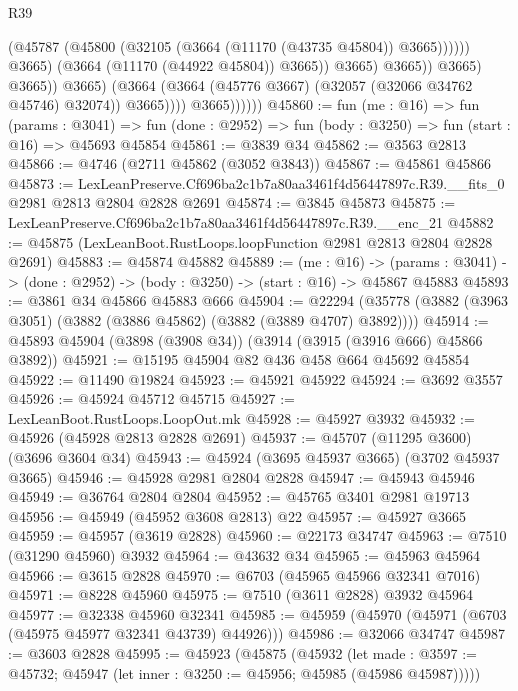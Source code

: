 \begin{lexlean}{R39}
\begin{coremodule}
                                            (@45787
                                              (@45800
                                                (@32105 (@3664 (@11170 (@43735 @45804)) @3665))))))
                                        @3665)
                                      (@3664 (@11170 (@44922 @45804)) @3665))
                                    @3665)
                                  @3665))
                              @3665)
                            @3665))
                        @3665)
                      (@3664 (@3664 (@45776 @3667) (@32057 (@32066 @34762 @45746) @32074)) @3665))))
                @3665))))))
@45860 := fun (me : @16) =>
  fun (params : @3041) =>
  fun (done : @2952) => fun (body : @3250) => fun (start : @16) => @45693 @45854
@45861 := @3839 @34
@45862 := @3563 @2813
@45866 := @4746 (@2711 @45862 (@3052 @3843))
@45867 := @45861 @45866
@45873 := LexLeanPreserve.Cf696ba2c1b7a80aa3461f4d56447897c.R39.__fits_0
    @2981
    @2813
    @2804
    @2828
    @2691
@45874 := @3845 @45873
@45875 := LexLeanPreserve.Cf696ba2c1b7a80aa3461f4d56447897c.R39.__enc_21
@45882 := @45875 (LexLeanBoot.RustLoops.loopFunction @2981 @2813 @2804 @2828 @2691)
@45883 := @45874 @45882
@45889 := (me : @16) ->
  (params : @3041) -> (done : @2952) -> (body : @3250) -> (start : @16) -> @45867 @45883
@45893 := @3861 @34 @45866 @45883 @666
@45904 := @22294 (@35778 (@3882 (@3963 @3051) (@3882 (@3886 @45862) (@3882 (@3889 @4707) @3892))))
@45914 := @45893 @45904 (@3898 (@3908 @34)) (@3914 (@3915 (@3916 @666) @45866 @3892))
@45921 := @15195 @45904 @82 @436 @458 @664 @45692 @45854
@45922 := @11490 @19824
@45923 := @45921 @45922
@45924 := @3692 @3557
@45926 := @45924 @45712 @45715
@45927 := LexLeanBoot.RustLoops.LoopOut.mk
@45928 := @45927 @3932
@45932 := @45926 (@45928 @2813 @2828 @2691)
@45937 := @45707 (@11295 @3600) (@3696 @3604 @34)
@45943 := @45924 (@3695 @45937 @3665) (@3702 @45937 @3665)
@45946 := @45928 @2981 @2804 @2828
@45947 := @45943 @45946
@45949 := @36764 @2804 @2804
@45952 := @45765 @3401 @2981 @19713
@45956 := @45949 (@45952 @3608 @2813) @22
@45957 := @45927 @3665
@45959 := @45957 (@3619 @2828)
@45960 := @22173 @34747
@45963 := @7510 (@31290 @45960) @3932
@45964 := @43632 @34
@45965 := @45963 @45964
@45966 := @3615 @2828
@45970 := @6703 (@45965 @45966 @32341 @7016)
@45971 := @8228 @45960
@45975 := @7510 (@3611 @2828) @3932 @45964
@45977 := @32338 @45960 @32341
@45985 := @45959 (@45970 (@45971 (@6703 (@45975 @45977 @32341 @43739) @44926)))
@45986 := @32066 @34747
@45987 := @3603 @2828
@45995 := @45923
    (@45875
      (@45932
        (let made : @3597 := @45732; @45947 (let inner : @3250 := @45956; @45985 (@45986 @45987)))))

\end{coremodule}
\end{lexlean}
